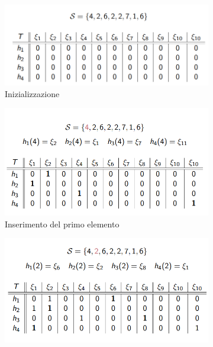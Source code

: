 \begin{figure}[!ht]
    \centering
    \begin{subfigure}[b]{0.45\textwidth}
        \centering
        \includegraphics[width=\textwidth]{img/hash/CMS1.png}
        \caption{Inizializzazione}
    \end{subfigure}
    \hfill
    \begin{subfigure}[b]{0.45\textwidth}
        \centering
        \includegraphics[width=\textwidth]{img/hash/CMS2.png}
        \caption{Inserimento del primo elemento}
    \end{subfigure}
    \hfill
    \begin{subfigure}[b]{0.45\textwidth}
        \centering
        \includegraphics[width=\textwidth]{img/hash/CMS3.png}

\end{subfigure}
\end{figure}

